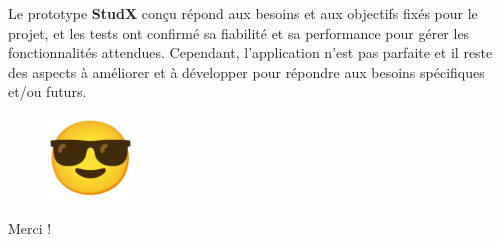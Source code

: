 \documentclass{beamer}
\begin{document}
\begin{frame}
  Le prototype \textbf{StudX} conçu répond aux besoins et aux objectifs fixés pour le projet, et les tests ont 
  confirmé sa fiabilité et sa performance pour gérer les fonctionnalités 
  attendues. Cependant, l'application n'est pas parfaite et il reste des aspects à améliorer et à développer pour répondre aux besoins
  spécifiques et/ou futurs.
\end{frame}

\begin{frame}
  \begin{center}
    \begin{figure}[H]
      \centering
      \includegraphics[width=0.2\textwidth]{emoticone}
  \end{figure}
  \LARGE{Merci !}
  \end{center}

\end{frame}
\end{document}
